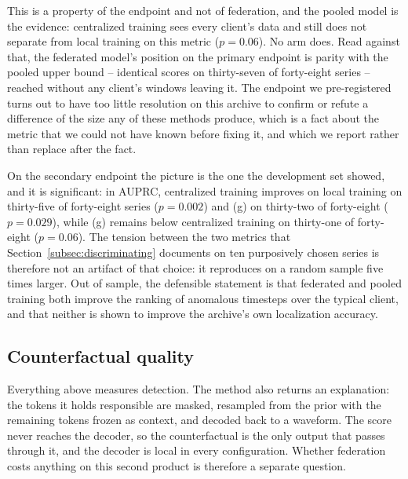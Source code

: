 \documentclass[conference]{IEEEtran}
\begin{document}
This is a property of the endpoint and not of federation, and the pooled model is the evidence:
centralized training sees every client's data and still does not separate from local training on
this metric ($p=0.06$). No arm does. Read against that, the federated model's position on the
primary endpoint is parity with the pooled upper bound -- identical scores on thirty-seven of
forty-eight series -- reached without any client's windows leaving it. The endpoint we
pre-registered turns out to have too little resolution on this archive to confirm or refute a
difference of the size any of these methods produce, which is a fact about the metric that we could
not have known before fixing it, and which we report rather than replace after the fact.

On the secondary endpoint the picture is the one the development set showed, and it is significant:
in AUPRC, centralized training improves on local training on thirty-five of forty-eight series
($p=0.002$) and (g) on thirty-two of forty-eight ($p=0.029$), while (g) remains below centralized
training on thirty-one of forty-eight ($p=0.06$). The tension between the two metrics that
Section~\ref{subsec:discriminating} documents on ten purposively chosen series is therefore not an
artifact of that choice: it reproduces on a random sample five times larger. Out of sample, the
defensible statement is that federated and pooled training both improve the ranking of anomalous
timesteps over the typical client, and that neither is shown to improve the archive's own
localization accuracy.

\subsection{Counterfactual quality}
\label{subsec:counterfactual}

Everything above measures detection. The method also returns an explanation: the tokens it holds
responsible are masked, resampled from the prior with the remaining tokens frozen as context, and
decoded back to a waveform. The score never reaches the decoder, so the counterfactual is the only
output that passes through it, and the decoder is local in every configuration. Whether federation
costs anything on this second product is therefore a separate question.
\end{document}
